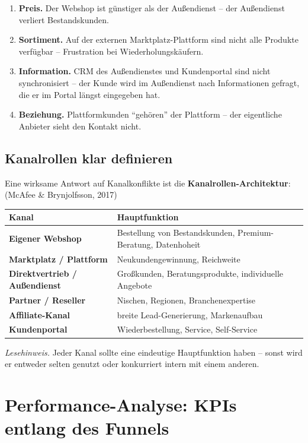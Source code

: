 \documentclass[11pt,a4paper,oneside]{article}
\newcommand{\fachbegriff}[1]{\textbf{#1}}
\newcommand{\quelle}[1]{{\footnotesize\color{lpGray}(#1)}}
\begin{document}
\begin{enumerate}
  \item \textbf{Preis.} Der Webshop ist günstiger als der Außendienst -- der Außendienst verliert Bestandskunden.
  \item \textbf{Sortiment.} Auf der externen Marktplatz-Plattform sind nicht alle Produkte verfügbar -- Frustration bei Wiederholungskäufern.
  \item \textbf{Information.} CRM des Außendienstes und Kundenportal sind nicht synchronisiert -- der Kunde wird im Außendienst nach Informationen gefragt, die er im Portal längst eingegeben hat.
  \item \textbf{Beziehung.} Plattformkunden ``gehören'' der Plattform -- der eigentliche Anbieter sieht den Kontakt nicht.
\end{enumerate}

\subsection{Kanalrollen klar definieren}

Eine wirksame Antwort auf Kanalkonflikte ist die \fachbegriff{Kanalrollen-Architektur}: \quelle{McAfee \& Brynjolfsson, 2017}

\begin{tabularx}{\linewidth}{@{}>{\bfseries}lX@{}}
\toprule
Kanal & Hauptfunktion \\
\midrule
Eigener Webshop & Bestellung von Bestandskunden, Premium-Beratung, Datenhoheit \\
Marktplatz / Plattform & Neukundengewinnung, Reichweite \\
Direktvertrieb / Außendienst & Großkunden, Beratungsprodukte, individuelle Angebote \\
Partner / Reseller & Nischen, Regionen, Branchenexpertise \\
Affiliate-Kanal & breite Lead-Generierung, Markenaufbau \\
Kundenportal & Wiederbestellung, Service, Self-Service \\
\bottomrule
\end{tabularx}

\medskip

\noindent\emph{Lesehinweis.} Jeder Kanal sollte eine eindeutige Hauptfunktion haben -- sonst wird er entweder selten genutzt oder konkurriert intern mit einem anderen.

\section{Performance-Analyse: KPIs entlang des Funnels}
\end{document}

